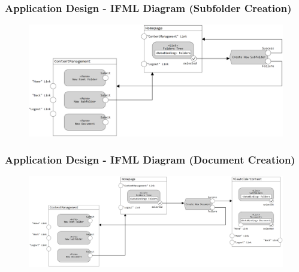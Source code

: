 \documentclass[aspectratio=169]{beamer}
\begin{document}
\begin{frame}
    \frametitle{Application Design - IFML Diagram (Subfolder Creation)}
    \begin{figure}
        \centering
        \includegraphics[width=0.9\linewidth]{Resources/IFMLs/images/IFML - Subfolder Creation.png}
    \end{figure}
\end{frame}

\begin{frame}
    \frametitle{Application Design - IFML Diagram (Document Creation)}
    \begin{figure}
        \centering
        \includegraphics[width=0.9\linewidth]{Resources/IFMLs/images/IFML - Document Creation.png}
    \end{figure}
\end{frame}
\end{document}
